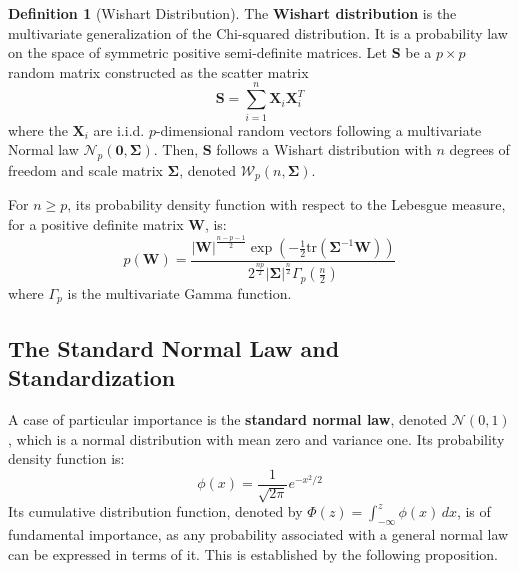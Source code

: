\documentclass[12pt, openany]{book}
\theoremstyle{definition}
\newtheorem{definition}{Definition}[section]
\theoremstyle{plain}
\theoremstyle{remark}
\begin{document}
\begin{definition}[Wishart Distribution]
The \textbf{Wishart distribution} is the multivariate generalization of the Chi-squared distribution. It is a probability law on the space of symmetric positive semi-definite matrices. Let $\mathbf{S}$ be a $p \times p$ random matrix constructed as the scatter matrix
$$ \mathbf{S} = \sum_{i=1}^n \mathbf{X}_i \mathbf{X}_i^T $$
where the $\mathbf{X}_i$ are i.i.d. $p$-dimensional random vectors following a multivariate Normal law $\mathcal{N}_p(\mathbf{0}, \mathbf{\Sigma})$. Then, $\mathbf{S}$ follows a Wishart distribution with $n$ degrees of freedom and scale matrix $\mathbf{\Sigma}$, denoted $\mathcal{W}_p(n, \mathbf{\Sigma})$.

For $n \ge p$, its probability density function with respect to the Lebesgue measure, for a positive definite matrix $\mathbf{W}$, is:
$$ p(\mathbf{W}) = \frac{|\mathbf{W}|^{\frac{n-p-1}{2}} \exp\left(-\frac{1}{2}\mathrm{tr}(\mathbf{\Sigma}^{-1}\mathbf{W})\right)}{2^{\frac{np}{2}}|\mathbf{\Sigma}|^{\frac{n}{2}}\Gamma_p(\frac{n}{2})} $$
where $\Gamma_p$ is the multivariate Gamma function.
\end{definition}

\subsection{The Standard Normal Law and Standardization}

A case of particular importance is the \textbf{standard normal law}, denoted $\mathcal{N}(0,1)$, which is a normal distribution with mean zero and variance one. Its probability density function is:
$$ \phi(x) = \frac{1}{\sqrt{2\pi}} e^{-x^2/2} $$
Its cumulative distribution function, denoted by $\Phi(z) = \int_{-\infty}^{z} \phi(x)\,dx$, is of fundamental importance, as any probability associated with a general normal law can be expressed in terms of it. This is established by the following proposition.
\end{document}
